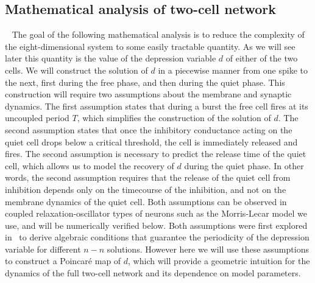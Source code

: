 \documentclass[utf8]{frontiersFPHY} %
\begin{document}
\subsection{Mathematical analysis of two-cell network}
~\label{sec:assumptions}
The goal of the following mathematical analysis is to reduce the complexity of the eight-dimensional system to some easily tractable quantity.
As we will see later this quantity is the value of the depression variable $d$ of either of the two cells.
We will construct the solution of $d$ in a piecewise manner from one spike to the next, first during the free phase, and then during the quiet phase.
This construction will require two assumptions about the membrane and synaptic dynamics.
The first assumption states that during a burst the free cell fires at its uncoupled period $T$, which simplifies the construction of the solution of $d$.
The second assumption states that once the inhibitory conductance acting on the quiet cell drops below a critical threshold, the cell is immediately released and fires.
The second assumption is necessary to predict the release time of the quiet cell, which allows us to model the recovery of $d$ during the quiet phase.
In other words, the second assumption requires that the release of the quiet cell from inhibition depends only on the timecourse of the inhibition, and not on the membrane dynamics of the quiet cell.
Both assumptions can be observed in coupled relaxation-oscillator types of neurons such as the Morris-Lecar model we use, and will be numerically verified below.
Both assumptions were first explored in~\cite{bose2011} to derive algebraic conditions that guarantee the periodicity of the depression variable for different $n-n$ solutions.
However here we will use these assumptions to construct a Poincaré map of $d$, which will provide a geometric intuition for the dynamics of the full two-cell network and its dependence on model parameters.
\end{document}
